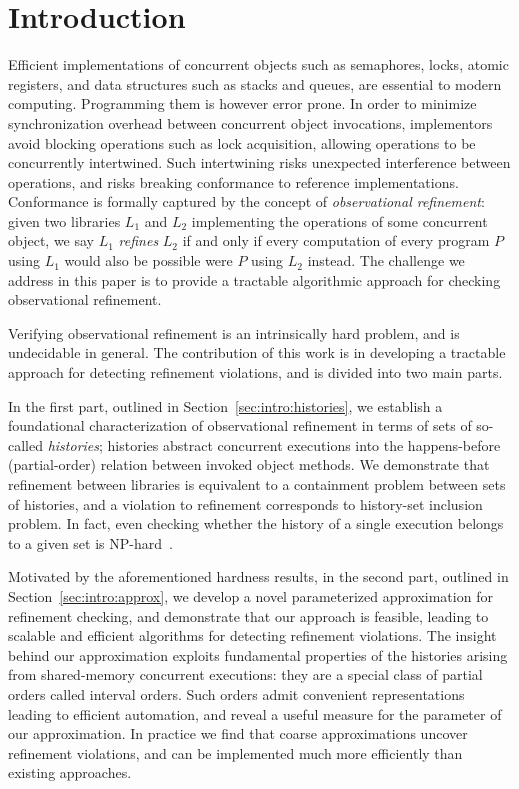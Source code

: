 \section{Introduction}

Efficient implementations of concurrent objects such as semaphores, locks,
atomic registers, and data structures such as stacks and queues, are essential
to modern computing. Programming them is however error prone. In order to
minimize synchronization overhead between concurrent object invocations,
implementors avoid blocking operations such as lock acquisition, allowing
operations to be concurrently intertwined. Such intertwining risks unexpected
interference between operations, and risks breaking conformance to reference
implementations. Conformance is formally captured by the concept of
\emph{observational refinement}: given two libraries $L_1$ and $L_2$
implementing the operations of some concurrent object, we say $L_1$
\emph{refines} $L_2$ if and only if every computation of every program $P$
using $L_1$ would also be possible were $P$ using $L_2$ instead. The challenge
we address in this paper is to provide a tractable algorithmic approach for
checking observational refinement.

Verifying observational refinement is an intrinsically hard problem, and is
undecidable in general. The contribution of this work is in developing a
tractable approach for detecting refinement violations, and is divided into two
main parts.

In the first part, outlined in Section~\ref{sec:intro:histories}, we establish
a foundational characterization of observational refinement in terms of sets of
so-called \emph{histories}; histories abstract concurrent executions into the
happens-before (partial-order) relation between invoked object methods. We
demonstrate that refinement between libraries is equivalent to a containment
problem between sets of histories, and a violation to refinement corresponds to
history-set inclusion problem. In fact, even checking whether the history of a
single execution belongs to a given set is
NP-hard~\cite{journals/siamcomp/GibbonsK97}.

Motivated by the aforementioned hardness results, in the second part, outlined
in Section~\ref{sec:intro:approx}, we develop a novel parameterized
approximation for refinement checking, and demonstrate that our approach is
feasible, leading to scalable and efficient algorithms for detecting refinement
violations. The insight behind our approximation exploits fundamental
properties of the histories arising from shared-memory concurrent executions:
they are a special class of partial orders called interval orders. Such orders
admit convenient representations leading to efficient automation, and reveal a
useful measure for the parameter of our approximation. In practice we find that
coarse approximations uncover refinement violations, and can be implemented
much more efficiently than existing approaches.

